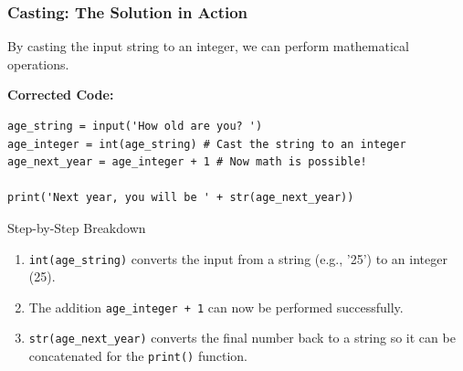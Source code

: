 \documentclass{beamer}
\begin{document}
\begin{frame}[fragile]
    \frametitle{Casting: The Solution in Action}
    
    By casting the input string to an integer, we can perform mathematical operations.
    \vspace{1em}

    \textbf{Corrected Code:}
\begin{verbatim}
age_string = input('How old are you? ')
age_integer = int(age_string) # Cast the string to an integer
age_next_year = age_integer + 1 # Now math is possible!

print('Next year, you will be ' + str(age_next_year))
\end{verbatim}
    
    \vspace{1em}
    \begin{block}{Step-by-Step Breakdown}
        \begin{enumerate}
            \item \texttt{int(age\_string)} converts the input from a string (e.g., '25') to an integer (25).
            \item The addition \texttt{age\_integer + 1} can now be performed successfully.
            \item \texttt{str(age\_next\_year)} converts the final number back to a string so it can be concatenated for the \texttt{print()} function.
        \end{enumerate}
    \end{block}

\end{frame}
\end{document}
